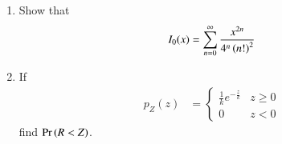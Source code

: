 \documentclass[journal,12pt,twocolumn]{IEEEtran}
\renewcommand\thesection{\arabic{section}}
\begin{document}
\begin{enumerate}[label=\thesection.\arabic*
,ref=\thesection.\theenumi]
\begin{enumerate}
\begin{align}
p_{R}\brak{r} = \frac{e^{-\frac{r +m}{k}}}{ k}I_{0}\brak{\frac{2\sqrt{mr}}{k}},\quad m = \sqrt{m_1^2+m_2^2}
\end{align}
%
\item
Show that
\begin{align}
I_0(x) = \sum_{n=0}^{\infty}\frac{x^{2n}}{4^n\left(n!\right)^2}
\end{align}
\item 
If
%
\begin{align}
p_{Z}(z) &= 
\begin{cases}
\frac{1}{k} e^{-\frac{z}{k}} & z \geq 0 \\
0 & z < 0
\end{cases}
\end{align}
%
find $\Pr\left(R < Z\right)$.
\end{enumerate}

\end{enumerate}
\end{document}
